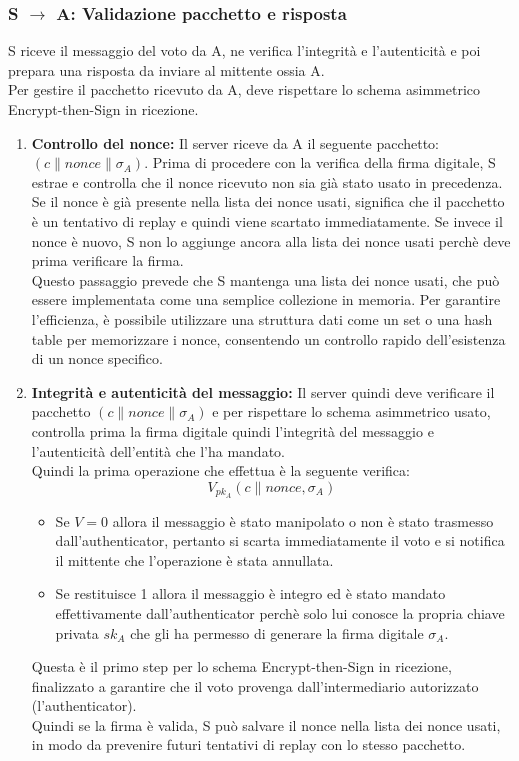 	\subsubsection{S $\to$ A: Validazione pacchetto e risposta}
		S riceve il messaggio del voto da A, ne verifica l'integrità e l'autenticità e poi prepara una risposta da inviare al mittente ossia A.\\
		Per gestire il pacchetto ricevuto da A, deve rispettare lo schema asimmetrico Encrypt-then-Sign in ricezione.
		
		\begin{enumerate}
			\item \textbf{Controllo del nonce:} Il server riceve da A il seguente pacchetto: $(c\| nonce \| \sigma_{A})$. Prima di procedere con la verifica della firma digitale, S estrae e controlla che il nonce ricevuto non sia già stato usato in precedenza. Se il nonce è già presente nella lista dei nonce usati, significa che il pacchetto è un tentativo di replay e quindi viene scartato immediatamente. Se invece il nonce è nuovo, S non lo aggiunge ancora alla lista dei nonce usati perchè deve prima verificare la firma.\\
			Questo passaggio prevede che S mantenga una lista dei nonce usati, che può essere implementata come una semplice collezione in memoria. Per garantire l'efficienza, è possibile utilizzare una struttura dati come un set o una hash table per memorizzare i nonce, consentendo un controllo rapido dell'esistenza di un nonce specifico.
			
			\item \textbf{Integrità e autenticità del messaggio:} Il server quindi deve verificare il pacchetto $(c\| nonce \| \sigma_{A})$ e per rispettare lo schema asimmetrico usato, controlla prima la firma digitale quindi l'integrità del messaggio e l'autenticità dell'entità che l'ha mandato.\\
			Quindi la prima operazione che effettua è la seguente verifica:
			$$ V_{pk_A}(c \| nonce, \sigma_{A}) $$
			\begin{itemize}
				\item Se $V=0$ allora il messaggio è stato manipolato o non è stato trasmesso dall'authenticator, pertanto si scarta immediatamente il voto e si notifica il mittente che l'operazione è stata annullata.
				
				\item Se restituisce 1 allora il messaggio è integro ed è stato mandato effettivamente dall'authenticator perchè solo lui conosce la propria chiave privata $sk_A$ che gli ha permesso di generare la firma digitale $\sigma_A$.
			\end{itemize}
			Questa è il primo step per lo schema Encrypt-then-Sign in ricezione, finalizzato a garantire che il voto provenga dall'intermediario autorizzato (l'authenticator).\\
			Quindi se la firma è valida, S può salvare il nonce nella lista dei nonce usati, in modo da prevenire futuri tentativi di replay con lo stesso pacchetto.
			

\end{enumerate}
